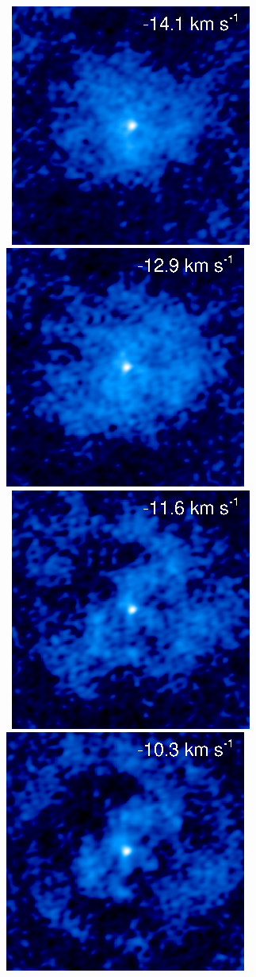 \documentclass[manuscript]{aastex}
\begin{document}
\begin{figure}[hbt!]
{          }
\\
\mbox{
          \includegraphics[]{f6.eps}
          \includegraphics[]{f7.eps}
         }
\\
\mbox{
          \includegraphics[]{f8.eps}
          \includegraphics[]{f9.eps}
}
\end{figure}
\end{document}
